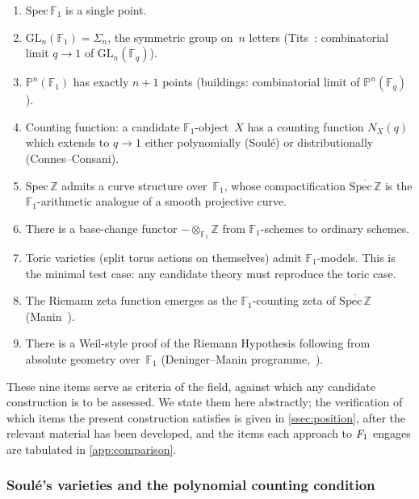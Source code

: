 \begin{enumerate}[label=(D\arabic*),leftmargin=*,nosep]
\item $\mathrm{Spec}\,\mathbb{F}_1$ is a single point.
\label{D1}
\item $\mathrm{GL}_n(\mathbb{F}_1) = \Sigma_n$, the symmetric
group on~$n$ letters
(Tits~\cite{tits56}: combinatorial limit $q\to 1$ of
$\mathrm{GL}_n(\mathbb{F}_q)$).\label{D2}
\item $\mathbb{P}^n(\mathbb{F}_1)$ has exactly $n+1$ points
(buildings: combinatorial limit of $\mathbb{P}^n(\mathbb{F}_q)$).
\label{D3}
\item Counting function: a candidate $\mathbb{F}_1$-object~$X$ has
a counting function $N_X(q)$ which extends to $q\to 1$ either
polynomially (Soul\'e) or distributionally (Connes--Consani).
\label{D4}
\item $\mathrm{Spec}\,\mathbb{Z}$ admits a curve structure
over~$\mathbb{F}_1$, whose compactification
$\overline{\mathrm{Spec}\,\mathbb{Z}}$ is the
$\mathbb{F}_1$-arithmetic analogue of a smooth projective
curve.\label{D5}
\item There is a base-change functor
$-\otimes_{\mathbb{F}_1}\mathbb{Z}$ from
$\mathbb{F}_1$-schemes to ordinary schemes.\label{D6}
\item Toric varieties (split torus actions on themselves) admit
$\mathbb{F}_1$-models.  This is the minimal test case: any
candidate theory must reproduce the toric case.\label{D7}
\item The Riemann zeta function emerges as the
$\mathbb{F}_1$-counting zeta of
$\overline{\mathrm{Spec}\,\mathbb{Z}}$ (Manin~\cite{manin95}).
\label{D8}
\item There is a Weil-style proof of the Riemann Hypothesis
following from absolute geometry over~$\mathbb{F}_1$
(Deninger--Manin programme,~\cite{deninger91,deninger92,manin95}).
\label{D9}
\end{enumerate}

These nine items serve as criteria of the field, against which
any candidate construction is to be assessed.  We state them here
abstractly; the verification of which items the present
construction satisfies is given in \cref{ssec:position}, after
the relevant material has been developed, and the items each approach to $F_1$ engages are
tabulated in \cref{app:comparison}.

\subsubsection{Soul\'e's varieties and the polynomial counting
condition}\label{ssec:soule}

